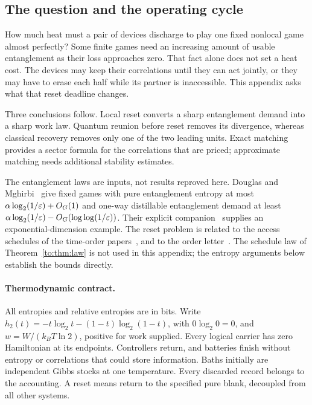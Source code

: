 \subsection{The question and the operating cycle}\label{hp:sec:model}
How much heat must a pair of devices discharge to play one fixed nonlocal game almost perfectly? Some finite games need an increasing amount of usable entanglement as their loss approaches zero. That fact alone does not set a heat cost. The devices may keep their correlations until they can act jointly, or they may have to erase each half while its partner is inaccessible. This appendix asks what that reset deadline changes.

Three conclusions follow. Local reset converts a sharp entanglement demand into a sharp work law. Quantum reunion before reset removes its divergence, whereas classical recovery removes only one of the two leading units. Exact matching provides a sector formula for the correlations that are priced; approximate matching needs additional stability estimates.

The entanglement laws are inputs, not results reproved here. Douglas and Mghirbi~\cite[Theorem 11.9 and Corollary 11.11]{HPprecision} give fixed games with pure entanglement entropy at most $\alpha\log_2(1/\varepsilon)+O_G(1)$ and one-way distillable entanglement demand at least $\alpha\log_2(1/\varepsilon)-O_G(\log\log(1/\varepsilon))$. Their explicit companion~\cite{HPexplicit} supplies an exponential-dimension example. The reset problem is related to the access schedules of the time-order papers~\cite{Order,SaveWork,Answering,KeepingTime}, and to the order letter~\cite{Letter}. The schedule law of Theorem~\ref{to:thm:law} is not used in this appendix; the entropy arguments below establish the bounds directly.

\paragraph{Thermodynamic contract.}
All entropies and relative entropies are in bits. Write $h_2(t)=-t\log_2t-(1-t)\log_2(1-t)$, with $0\log_2 0=0$, and $w=W/(k_BT\ln2)$, positive for work supplied. Every logical carrier has zero Hamiltonian at its endpoints. Controllers return, and batteries finish without entropy or correlations that could store information. Baths initially are independent Gibbs stocks at one temperature. Every discarded record belongs to the accounting. A reset means return to the specified pure blank, decoupled from all other systems.

